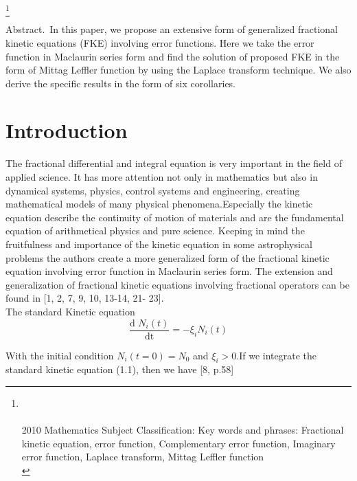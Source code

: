 \documentclass[leqno]{article}
\begin{document}
\thispagestyle{plain}     
\markboth{}{}
\footnote{{}\\ \\[-0.7cm]
2010 Mathematics Subject Classification: 
Key words and phrases: Fractional kinetic equation, error function, Complementary error function, Imaginary error function, Laplace transform, Mittag Leffler function\\
} 

\vspace{0.15in}
{\footnotesize{\sc Abstract.}\ In this paper, we propose an extensive form of generalized fractional kinetic equations (FKE) involving error functions. 
Here we take the error function in Maclaurin series form and find the solution of proposed FKE in the form of Mittag Leffler function by using the Laplace transform technique. We also derive the specific results in the form of six corollaries.
}
\section{Introduction}
\vspace{0.1in}
\indent
The fractional differential and integral equation is very important in the field of applied science. It has more attention not only in mathematics but also in dynamical systems, physics, control systems and engineering, creating mathematical models of many physical phenomena.Especially the kinetic equation describe the continuity of motion of materials and are the fundamental equation of arithmetical physics and pure science. Keeping in mind the fruitfulness and importance of the kinetic equation in some astrophysical problems the authors create a more generalized form of the fractional kinetic equation involving error function in Maclaurin series form. The extension and generalization of fractional kinetic equations involving fractional operators can be found in [1, 2, 7, 9, 10, 13-14, 21- 23].\\
The standard Kinetic equation
\begin{equation}
    \frac{\text{d $N_i(t)$}}{\text{dt}}
    = -\xi _i N_i(t)
\end{equation}

With the initial condition $N_i (t=0) = N_0$ and $\xi _i > 0$.If we integrate the standard kinetic equation (1.1), then we have [8, p.58]
\end{document}
